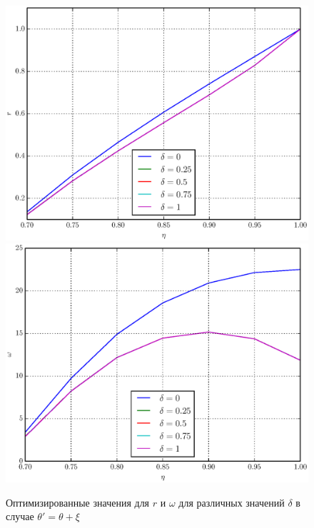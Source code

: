 \documentclass[%
master,         %
subf,           %
href,           %
colorlinks=true %
]{disser}
\numberwithin{equation}{section}
\numberwithin{figure}{section}
\begin{document}
\begin{figure}[h]
\includegraphics[scale=0.7]{r_ang.eps}
\includegraphics[scale=0.7]{omega_ang.eps}
\caption{Оптимизированные значения для $r$ и $\omega$ для различных значений $\delta$ в случае $\theta' = \theta + \xi$}
\label{fig:psi_ang}
\end{figure}
\end{document}
